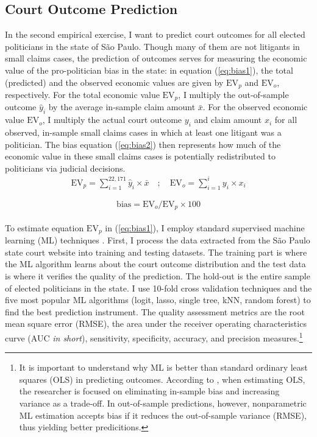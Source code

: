 \documentclass[11pt]{article}
\newcommand{\refp}[1]{(\ref{#1})}
\begin{document}
\subsection{Court Outcome Prediction} \label{subsec:methods2_paper2}

In the second empirical exercise, I want to predict court outcomes for all elected politicians in the state of São Paulo. Though many of them are not litigants in small claims cases, the prediction of outcomes serves for measuring the economic value of the pro-politician bias in the state: in equation \refp{eq:bias1}, the total (predicted) and the observed economic values are given by $\text{EV}_{p}$ and $\text{EV}_{o}$, respectively. For the total economic value $\text{EV}_{p}$, I multiply the out-of-sample outcome $\hat{y}_{i}$ by the average in-sample claim amount $\bar{x}$. For the observed economic value $\text{EV}_{o}$, I multiply the actual court outcome $y_{i}$ and claim amount $x_{i}$ for all observed, in-sample small claims cases in which at least one litigant was a politician. The bias equation \refp{eq:bias2} then represents how much of the economic value in these small claims cases is potentially redistributed to politicians via judicial decisions. \\

\begin{align}
  \text{EV}_{p} = \sum_{i = 1}^{22,171} \hat{y}_{i} \times \bar{x} \label{eq:bias1} \quad ; \quad \text{EV}_{o} = \sum_{i = 1}^{i} y_{i} \times x_{i}
\end{align}

\begin{equation}
  \text{bias} = \text{EV}_{o} / \text{EV}_{p} \times 100 \label{eq:bias2}
\end{equation} \\

To estimate equation $\text{EV}_{p}$ in \refp{eq:bias1}, I employ standard supervised machine learning (ML) techniques \citep{AtheypredictionUsingbig2017,KleinbergHumanDecisionsMachine2018,AtheyImpactMachineLearning2019}. First, I process the data extracted from the São Paulo state court website into training and testing datasets. The training part is where the ML algorithm learns about the court outcome distribution and the test data is where it verifies the quality of the prediction. The hold-out is the entire sample of elected politicians in the state. I use 10-fold cross validation techniques and the five most popular ML algorithms (logit, lasso, single tree, kNN, random forest) to find the best prediction instrument. The quality assessment metrics are the root mean square error (RMSE), the area under the receiver operating characteristics curve (AUC \emph{in short}), sensitivity, specificity, accuracy, and precision measures.\footnote{It is important to understand why ML is better than standard ordinary least squares (OLS) in predicting outcomes. According to \citet{KleinbergPredictionPolicyProblems2015}, when estimating OLS, the researcher is focused on eliminating in-sample bias and increasing variance as a trade-off. In out-of-sample predictions, however, nonparametric ML estimation accepts bias if it reduces the out-of-sample variance (RMSE), thus yielding better predicitions.}
\end{document}
